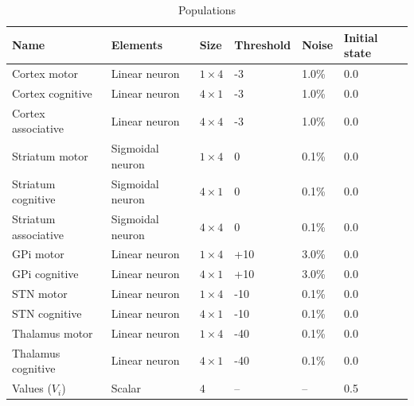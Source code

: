 \begin{table}[htbp]
  \small \centering
  \begin{tabular}{llllll}
\bf Name & \bf Elements & \bf Size & \bf Threshold & \bf Noise & \bf Initial state\\
\hline
Cortex motor & Linear neuron & \(1 \times 4\) & -3 & 1.0\% & 0.0\\
Cortex cognitive & Linear neuron & \(4 \times 1\) & -3 & 1.0\% & 0.0\\
Cortex associative & Linear neuron & \(4 \times 4\) & -3 & 1.0\% & 0.0\\
Striatum motor & Sigmoidal neuron & \(1 \times 4\) & 0 & 0.1\% & 0.0\\
Striatum cognitive & Sigmoidal neuron & \(4 \times 1\) & 0 & 0.1\% & 0.0\\
Striatum associative & Sigmoidal neuron & \(4 \times 4\) & 0 & 0.1\% & 0.0\\
GPi motor & Linear neuron & \(1 \times 4\) & +10 & 3.0\% & 0.0\\
GPi cognitive & Linear neuron & \(4 \times 1\) & +10 & 3.0\% & 0.0\\
STN motor & Linear neuron & \(1 \times 4\) & -10 & 0.1\% & 0.0\\
STN cognitive & Linear neuron & \(4 \times 1\) & -10 & 0.1\% & 0.0\\
Thalamus motor & Linear neuron & \(1 \times 4\) & -40 & 0.1\% & 0.0\\
Thalamus cognitive & Linear neuron & \(4 \times 1\) & -40 & 0.1\% & 0.0\\
Values (\(V_i\)) & Scalar & \(4\) & -- & -- & 0.5\\
\hline
\end{tabular}
\caption{Populations}
\end{table}

